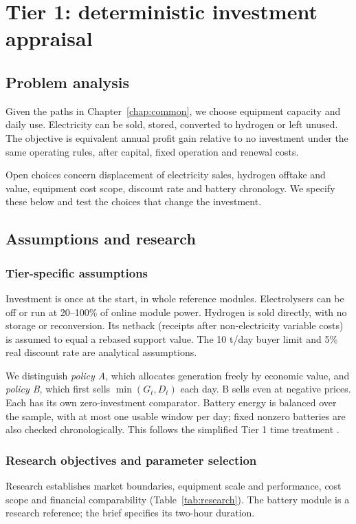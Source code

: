 \chapter{Tier 1: deterministic investment appraisal}\label{chap:tier1}
\section{Problem analysis}\label{sec:problem1}
Given the paths in Chapter~\ref{chap:common}, we choose equipment capacity
and daily use. Electricity can be sold, stored, converted to hydrogen or
left unused. The objective is equivalent annual profit gain relative to
no investment under the same operating rules, after capital, fixed operation
and renewal costs.

Open choices concern displacement of electricity sales, hydrogen offtake
and value, equipment cost scope, discount rate and battery chronology.
We specify these below and test the choices that change the investment.

\section{Assumptions and research}\label{sec:research1}
\subsection{Tier-specific assumptions}
Investment is once at the start, in whole reference modules. Electrolysers
can be off or run at 20--100\% of online module power. Hydrogen is sold
directly, with no storage or reconversion. Its netback (receipts after
non-electricity variable costs) is assumed to equal a rebased support value.
The 10 t/day buyer limit and 5\% real discount rate are analytical assumptions.

We distinguish \emph{policy A}, which allocates generation freely by economic
value, and \emph{policy B}, which first sells \(\min(G_t,D_t)\) each day.
B sells even at negative prices. Each has its own zero-investment comparator.
Battery energy is balanced over the sample, with at most one usable window
per day; fixed nonzero batteries are also checked chronologically.
This follows the simplified Tier 1 time treatment \cite{brief,teacher}.

\subsection{Research objectives and parameter selection}
Research establishes market boundaries, equipment scale and performance,
cost scope and financial comparability (Table~\ref{tab:research}). The battery
module is a research reference; the brief specifies its two-hour duration.

